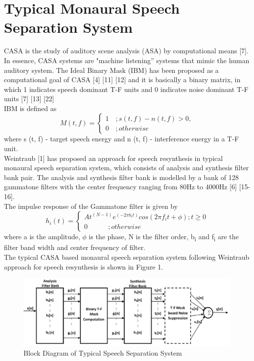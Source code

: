 \documentclass[a4paper]{article}
\begin{document}
\section{Typical Monaural Speech Separation System}

CASA is the study of auditory scene analysis (ASA) by computational means [7]. In essence, CASA systems are "machine listening” systems that mimic the human auditory system. The Ideal Binary Mask (IBM) has been proposed as a computational goal of CASA [4] [11] [12] and it is basically a binary matrix, in which 1 indicates speech dominant T-F units and 0 indicates noise dominant T-F units [7] [13] [22]
\\
IBM is defined as
\begin{equation}
M(t, f) = 
\begin{cases}
1   \quad ;s(t,f)-n(t,f)>0,\\
0   \quad ;otherwise    
\label{eq1}
\end{cases}
\end{equation}
where s (t, f) - target speech energy and n (t, f) - interference energy in a T-F unit.
\\Weintraub [1] has proposed an approach for speech resynthesis in typical monaural speech separation system, which consists of analysis and synthesis filter bank pair. The analysis and synthesis filter bank is modelled by a bank of 128 gammatone filters with the center frequency ranging from 80Hz to 4000Hz [6] [15-16].  
\\The impulse response of the Gammatone filter is given by
\begin{equation}
h_i{(t)} =  
\begin{cases}
At^{(N-1)} e^{(-2\pi b_i t)} cos(2\pi f_i t + \phi)  ;  t\geq0\\
0  \quad\quad\quad; otherwise                                                                            
\label{eq2}
\end{cases}
\end{equation}
where a is the amplitude, $\phi$ is the phase,  N is the filter order, b\textsubscript{i} and f\textsubscript{i} are the filter band width and center frequency of  filter.
\\The typical CASA based monaural speech separation system following Weintraub approach for speech resynthesis is shown in Figure 1. 
\begin{figure}[th]
  \centering
  \includegraphics[width=\linewidth]{weintraub.eps}
  \caption{Block Diagram of Typical Speech Separation System}
  \label{fig:speech_production}
\end{figure}
\end{document}
